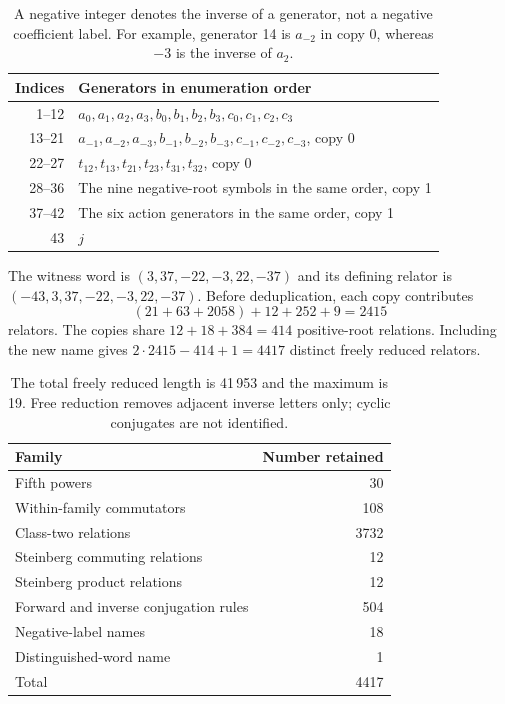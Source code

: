 \begin{table}[ht]
\centering\small
\begin{tabular}{@{}rl@{}}
\toprule
Indices & Generators in enumeration order\\
\midrule
1--12 & $a_0,a_1,a_2,a_3,b_0,b_1,b_2,b_3,c_0,c_1,c_2,c_3$\\
13--21 & $a_{-1},a_{-2},a_{-3},b_{-1},b_{-2},b_{-3},c_{-1},c_{-2},c_{-3}$, copy 0\\
22--27 & $t_{12},t_{13},t_{21},t_{23},t_{31},t_{32}$, copy 0\\
28--36 & The nine negative-root symbols in the same order, copy 1\\
37--42 & The six action generators in the same order, copy 1\\
43 & $j$\\
\bottomrule
\end{tabular}
\caption{A negative integer denotes the inverse of a generator, not a negative coefficient
label. For example, generator 14 is $a_{-2}$ in copy 0, whereas $-3$ is the inverse of $a_2$.}
\end{table}

The witness word is $(3,37,-22,-3,22,-37)$ and its defining relator is
$(-43,3,37,-22,-3,22,-37)$. Before deduplication, each copy contributes
\[
 (21+63+2058)+12+252+9=2415
\]
relators. The copies share $12+18+384=414$ positive-root relations. Including the new
name gives $2\cdot2415-414+1=4417$ distinct freely reduced relators.

\begin{table}[ht]
\centering\small
\begin{tabular}{@{}lr@{}}
\toprule
Family & Number retained\\
\midrule
Fifth powers & 30\\
Within-family commutators & 108\\
Class-two relations & 3732\\
Steinberg commuting relations & 12\\
Steinberg product relations & 12\\
Forward and inverse conjugation rules & 504\\
Negative-label names & 18\\
Distinguished-word name & 1\\
\midrule
Total & 4417\\
\bottomrule
\end{tabular}
\caption{The total freely reduced length is 41\,953 and the maximum is 19.
Free reduction removes adjacent inverse letters only; cyclic conjugates are not identified.}
\end{table}

